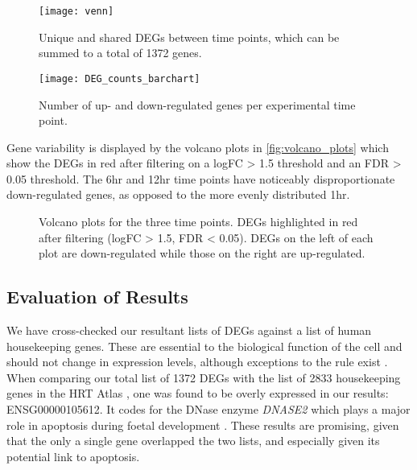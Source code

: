 
\begin{figure}[!h]
    \centering
    \texttt{[image: venn]}
    \caption{Unique and shared DEGs between time points, which can be summed to a total of 1372 genes.} 
    \label{fig:venn}
\end{figure}

\begin{figure}[!h]
    \centering
    \texttt{[image: DEG\_counts\_barchart]}
    \caption{Number of up- and down-regulated genes per experimental time point.} 
    \label{fig:DEG_counts_barchart}
\end{figure}
\clearpage
\pagebreak
Gene variability is displayed by the volcano plots in \autoref{fig:volcano_plots} which show the \ac{DEG}s in red after filtering on a \ac{logFC} > 1.5 threshold and an \ac{FDR} > 0.05 threshold. The 6hr and 12hr time points have noticeably disproportionate down-regulated genes, as opposed to the more evenly distributed 1hr.


\begin{figure}[!ht]
	\centering
	\qquad
	\qquad
	\caption{Volcano plots for the three time points. DEGs highlighted in red after filtering (logFC > 1.5, FDR < 0.05). DEGs on the left of each plot are down-regulated while those on the right are up-regulated. }        
	\label{fig:volcano_plots}
\end{figure}
\clearpage
\pagebreak
\subsection{Evaluation of Results}

We have cross-checked our resultant lists of \ac{DEG}s against a list of human housekeeping genes. These are essential to the biological function of the cell and should not change in expression levels, although exceptions to the rule exist \citep{khimani2005housekeeping}. When comparing our total list of 1372 \ac{DEG}s with the list of 2833 housekeeping genes in the HRT Atlas \citep{hounkpe2021hrt}, one was found to be overly expressed in our results: ENSG00000105612. It codes for the DNase enzyme \textit{DNASE2} which plays a major role in apoptosis during foetal development \citep{yasuda1998structure}. These results are promising, given that the only a single gene overlapped the two lists, and especially given its potential link to apoptosis.


